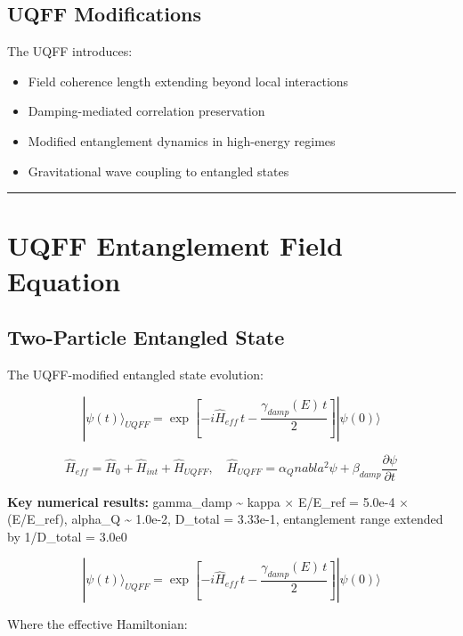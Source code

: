 \documentclass[12pt,a4paper]{article}
\begin{document}
\subsection{UQFF Modifications}

The UQFF introduces:

\begin{itemize}
  \item Field coherence length extending beyond local interactions
  \item Damping-mediated correlation preservation
  \item Modified entanglement dynamics in high-energy regimes
  \item Gravitational wave coupling to entangled states
\end{itemize}

\medskip\hrule\medskip

\section{UQFF Entanglement Field Equation}

\subsection{Two-Particle Entangled State}

The UQFF-modified entangled state evolution:

\begin{equation}
|\psi(t)\rangle_{UQFF} = \exp\!\left[-i\hat{H}_{eff}\,t - \frac{\gamma_{damp}(E)\,t}{2}\right]|\psi(0)\rangle
\end{equation}

\begin{equation}
\hat{H}_{eff} = \hat{H}_0 + \hat{H}_{int} + \hat{H}_{UQFF},\quad \hat{H}_{UQFF} = \alpha_Qnabla^2\psi + \beta_{damp}\frac{\partial\psi}{\partial t}
\end{equation}

\textbf{Key numerical results:} gamma\_damp \textasciitilde{} kappa $\times$ E/E\_ref = 5.0e-4 $\times$ (E/E\_ref), alpha\_Q \textasciitilde{} 1.0e-2, D\_total = 3.33e-1, entanglement range extended by 1/D\_total = 3.0e0

\begin{equation}
|\psi(t)\rangle_{UQFF} = \exp\!\left[-i\hat{H}_{eff}\,t - \frac{\gamma_{damp}(E)\,t}{2}\right]|\psi(0)\rangle
\end{equation}

Where the effective Hamiltonian:
\end{document}
